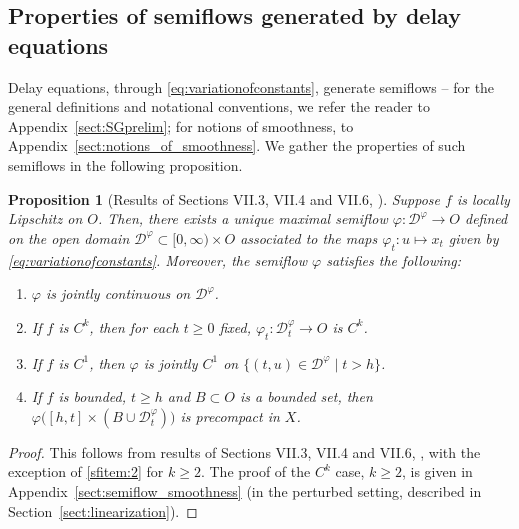 \documentclass[a4paper, 12pt, oneside, reqno, notitlepage]{amsart}
\theoremstyle{plain}
\newtheorem{proposition}[theorem]{Proposition}
\theoremstyle{definition}
\theoremstyle{remark}
\begin{document}
\subsection{Properties of semiflows generated by delay equations}
\label{sect:semiflow}


Delay equations, through \eqref{eq:variationofconstants}, generate semiflows -- for the general definitions and notational conventions, we refer the reader to Appendix~\ref{sect:SGprelim}; for notions of smoothness, to Appendix~\ref{sect:notions_of_smoothness}.
We gather the properties of such semiflows in the following proposition.

\begin{proposition}[Results of Sections VII.3, VII.4 and VII.6, \cite{diekmann2012delay}] \label{prop:semiflow}
    Suppose $f$ is locally Lipschitz on $O$.
    Then, there exists a unique maximal semiflow $\varphi:\mathcal{D}^\varphi \to O$ defined on the open domain $\mathcal{D}^\varphi \subset [0,\infty) \times O$ associated to the maps $\varphi_t:u \mapsto x_t$ given by \eqref{eq:variationofconstants}.
    Moreover, the semiflow $\varphi$ satisfies the following:
    \begin{enumerate}[label=\upshape{(\roman*)}]
        \item \label{sfitem:1} $\varphi$ is jointly continuous on $\mathcal{D}^\varphi$. 
        \item \label{sfitem:2} If $f$ is $C^k$, then for each $t \geq 0$ fixed, $\varphi_t : \mathcal{D}^\varphi_t \to O$ is $C^k$. 
        \item If $f$ is $C^1$, then $\varphi$ is jointly $C^1$ on $\{(t,u) \in \mathcal{D}^\varphi \; | \; t > h\}$. 
        \item \label{sfitem:4} If $f$ is bounded, $t \geq h$ and $B \subset O$ is a bounded set, then $\varphi\big( [h,t] \times (B \cup \mathcal{D}^\varphi_t) \big)$ is precompact in $X$. 
    \end{enumerate}
\end{proposition} 

\begin{proof}
    This follows from results of Sections VII.3, VII.4 and VII.6, \cite{diekmann2012delay}, with the exception of \ref{sfitem:2} for $k \geq 2$. 
    The proof of the $C^k$ case, $k \geq 2$, is given in Appendix~\ref{sect:semiflow_smoothness} (in the perturbed setting, described in Section~\ref{sect:linearization}).
\end{proof}
\end{document}
